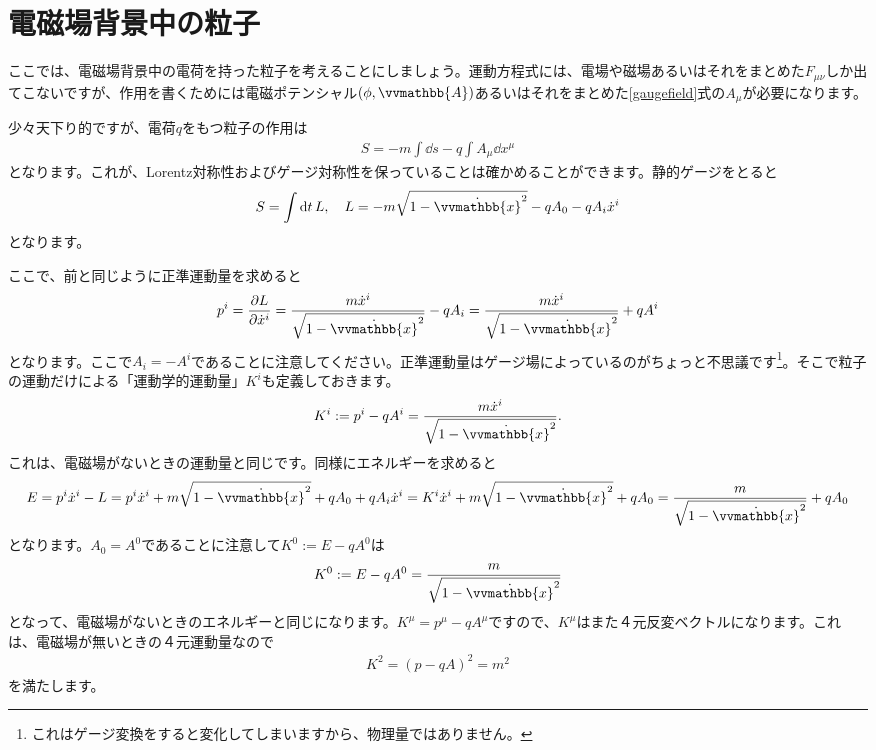 \documentclass[report,paper=a4, fontsize=12pt, line_length=16cm, number_of_lines=33,dvipdfmx]{jlreq}
\numberwithin{equation}{chapter}
\newcommand{\xb}{\vvmathbb{x}}
\newcommand{\Ab}{\vvmathbb{A}}
\begin{document}
\section{電磁場背景中の粒子}
\label{classicalelemagbackground}
ここでは、電磁場背景中の電荷を持った粒子を考えることにしましょう。運動方程式には、電場や磁場あるいはそれをまとめた$F_{\mu\nu}$しか出てこないですが、作用を書くためには電磁ポテンシャル$(\phi, \Ab)$あるいはそれをまとめた\eqref{gaugefield}式の$A_{\mu}$が必要になります。

少々天下り的ですが、電荷$q$をもつ粒子の作用は
\begin{align}
  S=-m\int \dd{s}-q\int A_{\mu}\dd{x}^{\mu}
\end{align}
となります。これが、Lorentz対称性およびゲージ対称性を保っていることは確かめることができます。静的ゲージをとると
\begin{align}
  S=\int \dd{t}L,\quad
  L=-m\sqrt{1-\dot{\xb}^2}-qA_{0}-qA_{i}\dot{x}^{i}
  \label{emstaticgauge}
\end{align}
となります。

ここで、前と同じように正準運動量を求めると
\begin{align}
  p^{i}=\pdv{L}{\dot{x}^i}
  =\frac{m\dot{x}^i}{\sqrt{1-\dot{\xb}^2}}-qA_{i}
  =\frac{m\dot{x}^i}{\sqrt{1-\dot{\xb}^2}}+qA^{i}
\end{align}
となります。ここで$A_i=-A^i$であることに注意してください。正準運動量はゲージ場によっているのがちょっと不思議です\footnote{これはゲージ変換をすると変化してしまいますから、物理量ではありません。}。そこで粒子の運動だけによる「運動学的運動量」$K^i$も定義しておきます。
\begin{align}
  K^i:=p^i-qA^{i}=\frac{m\dot{x}^i}{\sqrt{1-\dot{\xb}^2}}.
\end{align}
これは、電磁場がないときの運動量と同じです。同様にエネルギーを求めると
\begin{align}
  E=p^i\dot{x}^i-L
  =p^i\dot{x}^i+m\sqrt{1-\dot{\xb}^2}+qA_{0}+qA_{i}\dot{x}^{i}
  =K^i\dot{x}^i+m\sqrt{1-\dot{\xb}^2}+qA_{0}
  =\frac{m}{\sqrt{1-\dot{\xb}^2}}+qA_{0}
\end{align}
となります。$A_0=A^0$であることに注意して$K^0:=E-qA^0$は
\begin{align}
  K^0:=E-qA^0=\frac{m}{\sqrt{1-\dot{\xb}^2}}\label{kinematicalenergy}
\end{align}
となって、電磁場がないときのエネルギーと同じになります。$K^{\mu}=p^{\mu}-qA^{\mu}$ですので、$K^{\mu}$はまた４元反変ベクトルになります。これは、電磁場が無いときの４元運動量なので
\begin{align}
  K^2=(p-qA)^2=m^2
\end{align}
を満たします。
\end{document}
